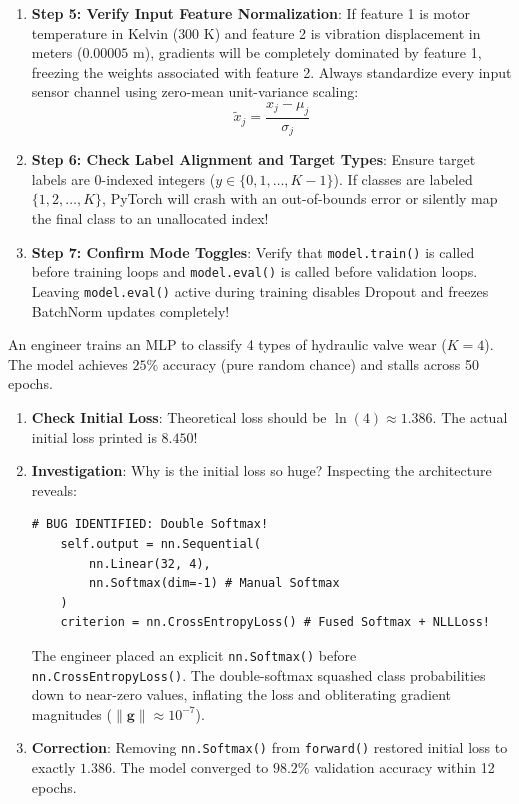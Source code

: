 \begin{enumerate}
    \item \textbf{Step 5: Verify Input Feature Normalization}: If feature 1 is motor temperature in Kelvin ($300\text{ K}$) and feature 2 is vibration displacement in meters ($0.00005\text{ m}$), gradients will be completely dominated by feature 1, freezing the weights associated with feature 2. Always standardize every input sensor channel using zero-mean unit-variance scaling:
    \begin{equation*}
    \tilde{x}_j = \frac{x_j - \mu_j}{\sigma_j}
    \end{equation*}
    
    \item \textbf{Step 6: Check Label Alignment and Target Types}: Ensure target labels are 0-indexed integers ($y \in \{0, 1, \dots, K-1\}$). If classes are labeled $\{1, 2, \dots, K\}$, PyTorch will crash with an out-of-bounds error or silently map the final class to an unallocated index!
    
    \item \textbf{Step 7: Confirm Mode Toggles}: Verify that \texttt{model.train()} is called before training loops and \texttt{model.eval()} is called before validation loops. Leaving \texttt{model.eval()} active during training disables Dropout and freezes BatchNorm updates completely!
\end{enumerate}

\begin{example}
An engineer trains an MLP to classify 4 types of hydraulic valve wear ($K = 4$). The model achieves $25\%$ accuracy (pure random chance) and stalls across 50 epochs.
\begin{enumerate}
    \item \textbf{Check Initial Loss}: Theoretical loss should be $\ln(4) \approx 1.386$. The actual initial loss printed is $8.450$!
    \item \textbf{Investigation}: Why is the initial loss so huge? Inspecting the architecture reveals:
    \begin{lstlisting}[style=pythonstyle]
    # BUG IDENTIFIED: Double Softmax!
    self.output = nn.Sequential(
        nn.Linear(32, 4),
        nn.Softmax(dim=-1) # Manual Softmax
    )
    criterion = nn.CrossEntropyLoss() # Fused Softmax + NLLLoss!
    \end{lstlisting}
    The engineer placed an explicit \texttt{nn.Softmax()} before \texttt{nn.CrossEntropyLoss()}. The double-softmax squashed class probabilities down to near-zero values, inflating the loss and obliterating gradient magnitudes ($\|\mathbf{g}\| \approx 10^{-7}$).
    \item \textbf{Correction}: Removing \texttt{nn.Softmax()} from \texttt{forward()} restored initial loss to exactly $1.386$. The model converged to $98.2\%$ validation accuracy within 12 epochs.
\end{enumerate}
\end{example}

